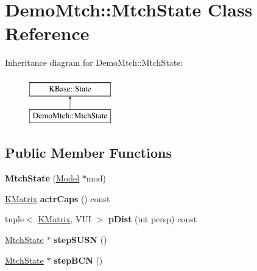 \hypertarget{class_demo_mtch_1_1_mtch_state}{\section{Demo\-Mtch\-:\-:Mtch\-State Class Reference}
\label{class_demo_mtch_1_1_mtch_state}
}
Inheritance diagram for Demo\-Mtch\-:\-:Mtch\-State\-:\begin{figure}[H]
\begin{center}
\leavevmode
\includegraphics[height=2.000000cm]{class_demo_mtch_1_1_mtch_state}
\end{center}
\end{figure}
\subsection*{Public Member Functions}
\begin{DoxyCompactItemize}
\item 
\hypertarget{class_demo_mtch_1_1_mtch_state_a940ce8e83428691267325da391fd12be}{{\bfseries Mtch\-State} (\hyperlink{class_k_base_1_1_model}{Model} $\ast$mod)}\label{class_demo_mtch_1_1_mtch_state_a940ce8e83428691267325da391fd12be}

\item 
\hypertarget{class_demo_mtch_1_1_mtch_state_a532c2e037446c993b622eba529c6f2c1}{\hyperlink{class_k_base_1_1_k_matrix}{K\-Matrix} {\bfseries actr\-Caps} () const }\label{class_demo_mtch_1_1_mtch_state_a532c2e037446c993b622eba529c6f2c1}

\item 
\hypertarget{class_demo_mtch_1_1_mtch_state_a68cc7caf8632a79c446d6762071adbf6}{tuple$<$ \hyperlink{class_k_base_1_1_k_matrix}{K\-Matrix}, V\-U\-I $>$ {\bfseries p\-Dist} (int persp) const }\label{class_demo_mtch_1_1_mtch_state_a68cc7caf8632a79c446d6762071adbf6}

\item 
\hypertarget{class_demo_mtch_1_1_mtch_state_acce55c8644a16a43ca7c1a82d48ad3e4}{\hyperlink{class_demo_mtch_1_1_mtch_state}{Mtch\-State} $\ast$ {\bfseries step\-S\-U\-S\-N} ()}\label{class_demo_mtch_1_1_mtch_state_acce55c8644a16a43ca7c1a82d48ad3e4}

\item 
\hypertarget{class_demo_mtch_1_1_mtch_state_ac7ce139b487b08c57af543620434877a}{\hyperlink{class_demo_mtch_1_1_mtch_state}{Mtch\-State} $\ast$ {\bfseries step\-B\-C\-N} ()}\label{class_demo_mtch_1_1_mtch_state_ac7ce139b487b08c57af543620434877a}

\end{DoxyCompactItemize}
